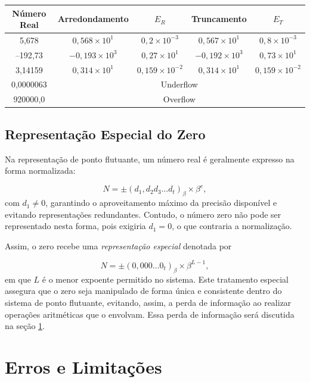 \begin{center}
\small
\begin{tabular}{|c|c|c|c|c|}
\hline
\textbf{Número Real} & \textbf{Arredondamento} & \textbf{\(E_R\)}  & \textbf{Truncamento} & \textbf{\(E_T\)}  \\
\hline
5{,}678 & \( 0{,}568 \times 10^1 \) & \( 0{,}2 \times 10^{-3} \) & \( 0{,}567 \times 10^1 \) & \( 0{,}8 \times 10^{-3} \) \\
\hline
–192{,}73 & \( -0{,}193 \times 10^3 \) & \( 0{,}27 \times 10^{1} \) & \( -0{,}192 \times 10^3 \) & \( 0{,}73 \times 10^{1} \) \\
\hline
3{,}14159 & \( 0{,}314 \times 10^1 \) & \( 0{,}159 \times 10^{-2} \) & \( 0{,}314 \times 10^1 \) & \( 0{,}159 \times 10^{-2} \) \\
\hline
0{,}0000063 & \multicolumn{4}{c|}{Underflow} \\
\hline
920000{,}0 & \multicolumn{4}{c|}{Overflow} \\
\hline
\end{tabular}
\end{center}


\subsection{Representação Especial do Zero}

Na representação de ponto flutuante, um número real é geralmente expresso na forma normalizada:

\[
N = \pm (d_1{,}d_2 d_3 \ldots d_t)_\beta \times \beta^{e},
\]
com \( d_1 \neq 0 \), garantindo o aproveitamento máximo da precisão disponível e evitando representações redundantes. Contudo, o número zero não pode ser representado nesta forma, pois exigiria \( d_1 = 0 \), o que contraria a normalização. 

Assim, o zero recebe uma \textit{representação especial} denotada por

\[
N = \pm (0{,}000\ldots 0_{t})_\beta \times \beta^{L - 1},
\]
em que \( L \) é o menor expoente permitido no sistema. Este tratamento especial assegura que o zero seja manipulado de forma única e consistente dentro do sistema de ponto flutuante, evitando, assim, a perda de informação ao realizar operações aritméticas que o envolvam. Essa perda de informação será discutida na seção \ref{subsec:erroselim}.



\section{Erros e Limitações}\label{subsec:erroselim}

